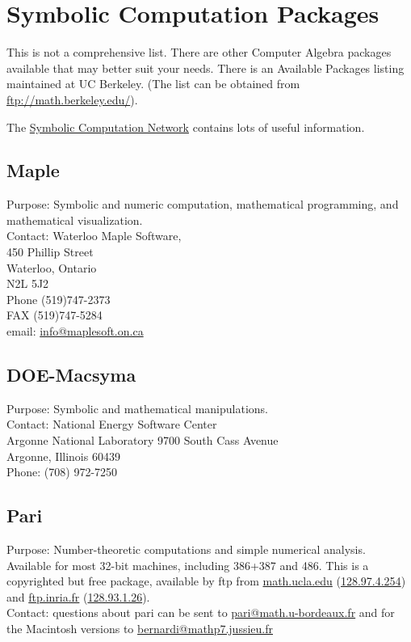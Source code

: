 \section{Symbolic Computation Packages}

This is not a comprehensive list. There are other Computer Algebra
packages available that may better suit your needs. There is an
Available Packages listing maintained at UC Berkeley.  (The list can be
obtained from \url{ftp://math.berkeley.edu/}).

The \href{http://symbolicnet.mcs.kent.edu/}{Symbolic Computation
  Network} contains lots of useful information.

\subsection{Maple}
        Purpose: Symbolic and numeric computation, mathematical
        programming, and mathematical visualization.\\
        Contact: Waterloo Maple Software,\\
        450 Phillip Street\\
        Waterloo, Ontario\\
        N2L 5J2\\
        Phone (519)747-2373\\
        FAX   (519)747-5284\\
        email:  \url{info@maplesoft.on.ca}

\subsection{DOE-Macsyma}
        Purpose: Symbolic and mathematical manipulations.\\
        Contact: National Energy Software Center\\
        Argonne National Laboratory 9700 South Cass Avenue\\
        Argonne, Illinois 60439\\
        Phone: (708) 972-7250

\subsection{Pari}
        Purpose: Number-theoretic computations and simple numerical
        analysis.\\
        Available for most 32-bit machines, including 386+387 and 486.
        This is a copyrighted but free package, available by ftp from
        \url{math.ucla.edu} (\url{128.97.4.254}) and \url{ftp.inria.fr} (\url{128.93.1.26}).\\
        Contact: questions about pari can be sent to \url{pari@math.u-bordeaux.fr}
        and for the Macintosh versions to \url{bernardi@mathp7.jussieu.fr}

